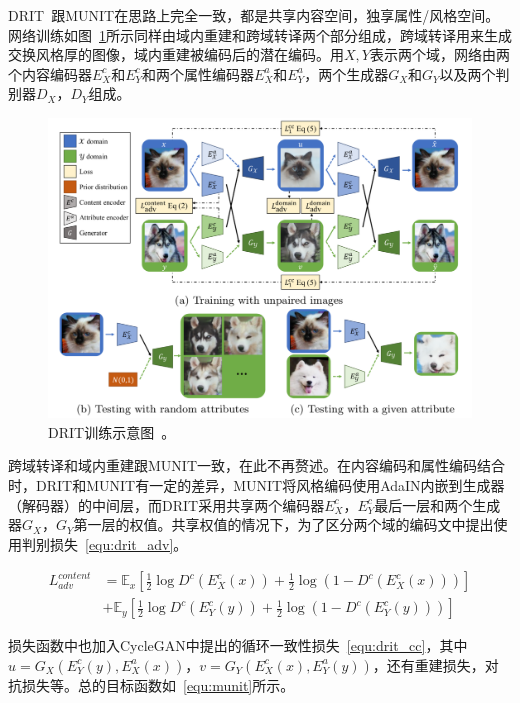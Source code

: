 DRIT~\cite{lee2018diverse}跟MUNIT在思路上完全一致，都是共享内容空间，独享属性/风格空间。网络训练如图~\ref{fig:drit}所示同样由域内重建和跨域转译两个部分组成，跨域转译用来生成交换风格厚的图像，域内重建被编码后的潜在编码。用$X, Y$表示两个域，网络由两个内容编码器$E_{X}^{c}$和$E_{Y}^{c}$和两个属性编码器$E_{X}^{a}$和$E_{Y}^{a}$，两个生成器$G_X$和$G_Y$以及两个判别器$D_X$，$D_Y$组成。

\begin{figure}[ht]
    \centering
	\includegraphics[width=\textwidth]{figs/DRIT.pdf}
	\caption{DRIT训练示意图~\cite{lee2018diverse}。}
	\label{fig:drit}
\end{figure}

跨域转译和域内重建跟MUNIT一致，在此不再赘述。在内容编码和属性编码结合时，DRIT和MUNIT有一定的差异，MUNIT将风格编码使用AdaIN内嵌到生成器（解码器）的中间层，而DRIT采用共享两个编码器$E_X^c$，$E_Y^c$最后一层和两个生成器$G_X$，$G_Y$第一层的权值。共享权值的情况下，为了区分两个域的编码文中提出使用判别损失~\ref{equ:drit_adv}。

\begin{equation}
\label{equ:drit_adv}
\begin{aligned}
L_{adv}^{content} & = \mathbb{E}_x[\frac{1}{2}\log D^c(E_X^c(x))+\frac{1}{2}\log(1-D^c(E_X^c(x)))] \\
& + \mathbb{E}_y[\frac{1}{2}\log D^c(E_Y^c(y))+\frac{1}{2}\log(1-D^c(E_Y^c(y)))] 
\end{aligned}
\end{equation}

损失函数中也加入CycleGAN中提出的循环一致性损失~\ref{equ:drit_cc}，其中$u=G_X(E_Y^c(y),E_X^a(x))$，$v=G_Y(E_X^c(x),E_Y^a(y))$，还有重建损失，对抗损失等。总的目标函数如~\ref{equ:munit}所示。


